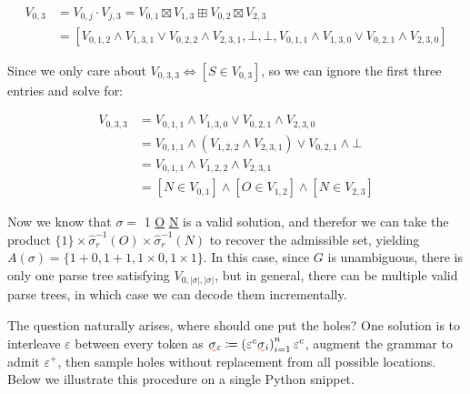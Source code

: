 \documentclass[sigplan,review,anonymous,acmsmall]{acmart}\settopmatter{printfolios=false,printccs=false,printacmref=false}
\begin{document}
  \begin{align}
    V_{0, 3} &= V_{0, j} \cdot V_{j, 3} = V_{0, 1} \boxtimes V_{1, 3} \boxplus V_{0, 2} \boxtimes V_{2, 3}\\
    &= [V_{0, 1, 2} \land V_{1, 3, 1} \lor V_{0, 2, 2} \land V_{2, 3, 1}, \bot, \bot, V_{0, 1, 1} \land V_{1, 3, 0} \lor V_{0, 2, 1} \land V_{2, 3, 0}]
  \end{align}

  Since we only care about $V_{0, 3, 3} \Leftrightarrow [S \in V_{0, 3}]$, so we can ignore the first three entries and solve for:

  \begin{align}
    V_{0, 3, 3} &= V_{0, 1, 1} \land V_{1, 3, 0} \lor V_{0, 2, 1} \land V_{2, 3, 0}\\
    &= V_{0, 1, 1} \land (V_{1, 2, 2} \land V_{2, 3, 1}) \lor V_{0, 2, 1} \land \bot\\
    &= V_{0, 1, 1} \land V_{1, 2, 2} \land V_{2, 3, 1}\\
    &= [N \in V_{0, 1}] \land [O \in V_{1, 2}] \land [N \in V_{2, 3}]
  \end{align}

  Now we know that $\sigma =$ 1 \underline{O} \underline{N} is a valid solution, and therefor we can take the product $\{1\}\times \hat\sigma_r^{-1}(O) \times \hat\sigma_r^{-1}(N)$ to recover the admissible set, yielding $A(\sigma)=\{1+0, 1+1, 1\times 0, 1\times 1\}$. In this case, since $G$ is unambiguous, there is only one parse tree satisfying $V_{0, |\sigma|, |\sigma|}$, but in general, there can be multiple valid parse trees, in which case we can decode them incrementally.

  The question naturally arises, where should one put the holes? One solution is to interleave $\varepsilon$ between every token as $\err{\sigma}_\varepsilon\coloneqq \left(\varepsilon^c\err{\sigma}_i\right)_{i=1}^n\varepsilon^c$, augment the grammar to admit $\varepsilon^+$, then sample holes without replacement from all possible locations. Below we illustrate this procedure on a single Python snippet.

%
%
%
\end{document}
